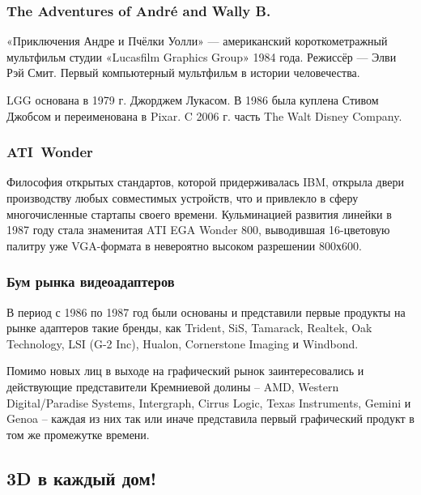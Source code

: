 \documentclass[10pt]{beamer}
\begin{document}
\begin{frame}\frametitle{The Adventures of André and Wally B.}
{
	{
	}
	{
		«Приключения Андре и Пчёлки Уолли»  — американский короткометражный мультфильм студии «Lucasfilm Graphics Group» 1984 года. Режиссёр — Элви Рэй Смит.	Первый компьютерный мультфильм в истории человечества.
		
		\hfill
		
	 	\footnotesize {}
	 	
	 	\hfill
	 	
		 \footnotesize	LGG основана в 1979 г. Джорджем Лукасом. В 1986 была куплена Стивом Джобсом и переименована в Pixar. C 2006 г. часть  The Walt Disney Company.
		 
		 
	}	
	

}\end{frame}


\begin{frame}\frametitle{ATI~Wonder}
{
	Философия открытых стандартов, которой придерживалась IBM, открыла двери производству любых совместимых устройств, что и привлекло в сферу многочисленные стартапы своего времени.
	{
	}
	{
		Кульминацией развития линейки в 1987 году стала знаменитая ATI EGA Wonder 800, выводившая 16-цветовую палитру уже VGA-формата в невероятно высоком разрешении 800х600. 
	}
}\end{frame}

\begin{frame}\frametitle{Бум рынка видеоадаптеров}{
В период с 1986 по 1987 год были основаны и представили первые продукты на рынке адаптеров такие бренды, как Trident, SiS, Tamarack, Realtek, Oak Technology, LSI (G-2 Inc), Hualon, Cornerstone Imaging и Windbond. 

Помимо новых лиц в выходе на графический рынок заинтересовались и действующие представители Кремниевой долины – AMD, Western Digital/Paradise Systems, Intergraph, Cirrus Logic, Texas Instruments, Gemini и Genoa – каждая из них так или иначе представила первый графический продукт в том же промежутке времени.
}\end{frame}

\subsection{3D в каждый дом!}
\frame{\subsectionpage}
\end{document}
